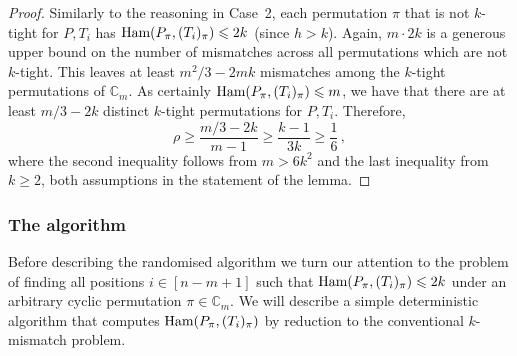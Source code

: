\documentclass[11pt]{article}
\renewcommand{\geq}{\geqslant}
\renewcommand{\leq}{\leqslant}
\newcommand{\ham}{\ensuremath{\textup{Ham}}}
\newcommand{\Fam}{\ensuremath{\mathbb{C}_m}}
\theoremstyle{plain}
\theoremstyle{definition}
\begin{document}
\begin{proof}
    Similarly to the reasoning in Case~2, each permutation $\pi$ that is not $k$-tight for $P,T_i$ has $\ham(P_\pi,(T_i)_\pi) \leq 2k$ (since $h>k$). Again, $m \cdot 2k$ is a generous upper bound on the number of mismatches across all permutations which are not $k$-tight. This leaves at least $m^2/3-2mk$ mismatches among the $k$-tight permutations of $\Fam$. As certainly $\ham(P_\pi,(T_i)_\pi) \leq m$, we have that there are at least $m/3-2k$ distinct $k$-tight permutations for $P,T_i$. Therefore,
\begin{equation*}
        \rho \geq \frac{m/3-2k}{m-1} \geq \frac{k-1}{3k} \geq \frac{1}{6} \,,
    \end{equation*}
    where the second inequality follows from $m > 6k^2$ and the last inequality from $k \geq 2$, both assumptions in the statement of the lemma.
\end{proof}



\subsubsection{The algorithm}

Before describing the randomised algorithm we turn our attention to the problem of finding all positions $i\in [n-m+1]$ such that $\ham(P_{\pi},(T_i)_{\pi}) \leq 2k$ under an arbitrary cyclic permutation $\pi \in \Fam$. We will describe a simple deterministic algorithm that computes $\ham(P_\pi,(T_i)_{\pi})$ by reduction to the conventional $k$-mismatch problem.
\end{document}
